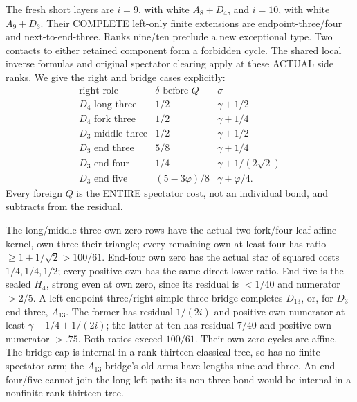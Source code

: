 The fresh short layers are \(i=9\), with
white \(A_8+D_4\), and \(i=10\), with
white \(A_9+D_3\).
Their COMPLETE left-only finite extensions are
endpoint-three/four and next-to-end-three.
Ranks nine/ten preclude a new exceptional type.
Two contacts to either retained component form
a forbidden cycle.
The shared local inverse formulas and original
spectator clearing apply at these ACTUAL side ranks.
We give the right and bridge cases explicitly:
\[
\begin{array}{c|c|c}
 \text{right role}&\delta\text{ before }Q&\sigma\\ \hline
 D_4\text{ long three}&1/2&\gamma+1/2\\
 D_4\text{ fork three}&1/2&\gamma+1/4\\
 D_3\text{ middle three}&1/2&\gamma+1/2\\
 D_3\text{ end three}&5/8&\gamma+1/4\\
 D_3\text{ end four}&1/4&\gamma+1/(2\sqrt2)\\
 D_3\text{ end five}&(5-3\varphi)/8&\gamma+\varphi/4 .
\end{array}
\]
Every foreign \(Q\) is the ENTIRE spectator cost,
not an individual bond, and subtracts from the residual.

The long/middle-three own-zero rows have the actual
two-fork/four-leaf affine kernel, own three their
triangle; every remaining own at least four has
ratio \(\ge1+1/\sqrt2>100/61\).
End-four own zero has the actual star of squared
costs \(1/4,1/4,1/2\); every positive own has
the same direct lower ratio.
End-five is the sealed \(H_4\), strong even at
own zero, since its residual is \(<1/40\)
and numerator \(>2/5\).
A left endpoint-three/right-simple-three bridge
completes \(D_{13}\), or, for \(D_3\) end-three,
\(A_{13}\).
The former has residual \(1/(2i)\) and positive-own
numerator at least \(\gamma+1/4+1/(2i)\);
the latter at ten has residual \(7/40\) and
positive-own numerator \(>.75\).
Both ratios exceed \(100/61\).
Their own-zero cycles are affine.
The bridge cap is internal in a rank-thirteen
classical tree, so has no finite spectator arm;
the \(A_{13}\) bridge's old arms have lengths
nine and three.
An end-four/five cannot join the long left path:
its non-three bond would be internal in a
nonfinite rank-thirteen tree.

